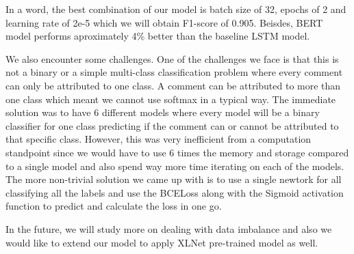 \documentclass[sigconf]{acmart}
\begin{document}
In a word, the best combination of our model is batch size of 32, epochs of 2 and learning rate of 2e-5 which we will obtain F1-score of 0.905.
Beisdes, BERT model performs aproximately 4\% better than the baseline LSTM model.


We also encounter some challenges. One of the challenges we face is that this is not a binary or a simple multi-class classification problem where every comment can only be attributed to one class. A comment can be attributed to more than one class which meant we cannot use softmax in a typical way. The immediate solution was to have 6 different models where every model will be a binary classifier for one class predicting if the comment can or cannot be attributed to that specific class. However, this was very inefficient from a computation standpoint since we would have to use 6 times the memory and storage compared to a single model and also spend way more time iterating on each of the models. The more non-trivial solution we came up with is to use a single newtork for all classifying all the labels and use the BCELoss along with the Sigmoid activation function to predict and calculate the loss in one go.

In the future, we will study more on dealing with data imbalance
and also we would like to extend our model to apply XLNet pre-trained model
as well.



%


\end{document}
